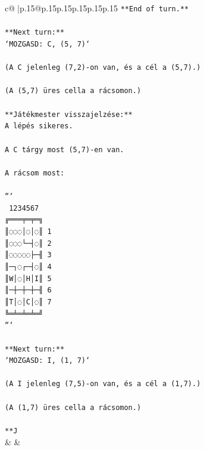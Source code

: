 \documentclass{article}
\begin{document}
{\begin{supertabular}{c@{$\;$}|p{.15\linewidth}@{}p{.15\linewidth}p{.15\linewidth}p{.15\linewidth}p{.15\linewidth}p{.15\linewidth}}
{{{\texttt{**End of turn.**  } \\
\\ 
\texttt{**Next turn:**  } \\
\texttt{`MOZGASD: C, (5, 7)`  } \\
\\ 
\texttt{(A C jelenleg (7,2){-}on van, és a cél a (5,7).)  } \\
\\ 
\texttt{(A (5,7) üres cella a rácsomon.)  } \\
\\ 
\texttt{**Játékmester visszajelzése:**  } \\
\texttt{A lépés sikeres.  } \\
\\ 
\texttt{A C tárgy most (5,7){-}en van.  } \\
\\ 
\texttt{A rácsom most:  } \\
\\ 
\texttt{```} \\
\texttt{ 1234567} \\
\texttt{╔═══╤═╤═╗} \\
\texttt{║◌◌◌│◌│◌║ 1} \\
\texttt{║◌◌◌└─┤◌║ 2} \\
\texttt{║◌◌◌◌◌├─╢ 3} \\
\texttt{║─┐◌┌─┤◌║ 4} \\
\texttt{║W│◌│H│I║ 5} \\
\texttt{║─┼─┼─┼─╢ 6} \\
\texttt{║T│◌│C│◌║ 7} \\
\texttt{╚═╧═╧═╧═╝} \\
\texttt{```  } \\
\\ 
\texttt{**Next turn:**  } \\
\texttt{`MOZGASD: I, (1, 7)`  } \\
\\ 
\texttt{(A I jelenleg (7,5){-}on van, és a cél a (1,7).)  } \\
\\ 
\texttt{(A (1,7) üres cella a rácsomon.)  } \\
\\ 
\texttt{**J} \\
            }
        }
    }
    & & \\ \\


\end{supertabular}}
\end{document}
